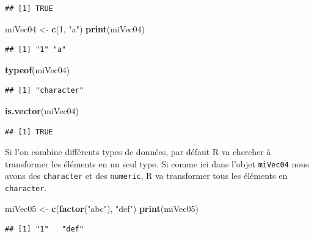 \documentclass[
]{book}
\newenvironment{Shaded}{\begin{snugshade}}{\end{snugshade}}
\newcommand{\DecValTok}[1]{\textcolor[rgb]{0.00,0.00,0.81}{#1}}
\newcommand{\KeywordTok}[1]{\textcolor[rgb]{0.13,0.29,0.53}{\textbf{#1}}}
\newcommand{\NormalTok}[1]{#1}
\newcommand{\StringTok}[1]{\textcolor[rgb]{0.31,0.60,0.02}{#1}}
\begin{document}
\begin{verbatim}
## [1] TRUE
\end{verbatim}

\begin{Shaded}
\begin{Highlighting}[]
\NormalTok{miVec04 <-}\StringTok{ }\KeywordTok{c}\NormalTok{(}\DecValTok{1}\NormalTok{, }\StringTok{"a"}\NormalTok{)}
\KeywordTok{print}\NormalTok{(miVec04)}
\end{Highlighting}
\end{Shaded}

\begin{verbatim}
## [1] "1" "a"
\end{verbatim}

\begin{Shaded}
\begin{Highlighting}[]
\KeywordTok{typeof}\NormalTok{(miVec04)}
\end{Highlighting}
\end{Shaded}

\begin{verbatim}
## [1] "character"
\end{verbatim}

\begin{Shaded}
\begin{Highlighting}[]
\KeywordTok{is.vector}\NormalTok{(miVec04)}
\end{Highlighting}
\end{Shaded}

\begin{verbatim}
## [1] TRUE
\end{verbatim}

Si l'on combine différents types de données, par défaut R va chercher à transformer les éléments en un seul type. Si comme ici dans l'objet \texttt{miVec04} nous avons des \texttt{character} et des \texttt{numeric}, R va transformer tous les éléments en \texttt{character}.

\begin{Shaded}
\begin{Highlighting}[]
\NormalTok{miVec05 <-}\StringTok{ }\KeywordTok{c}\NormalTok{(}\KeywordTok{factor}\NormalTok{(}\StringTok{"abc"}\NormalTok{), }\StringTok{"def"}\NormalTok{)}
\KeywordTok{print}\NormalTok{(miVec05)}
\end{Highlighting}
\end{Shaded}

\begin{verbatim}
## [1] "1"   "def"
\end{verbatim}
\end{document}
